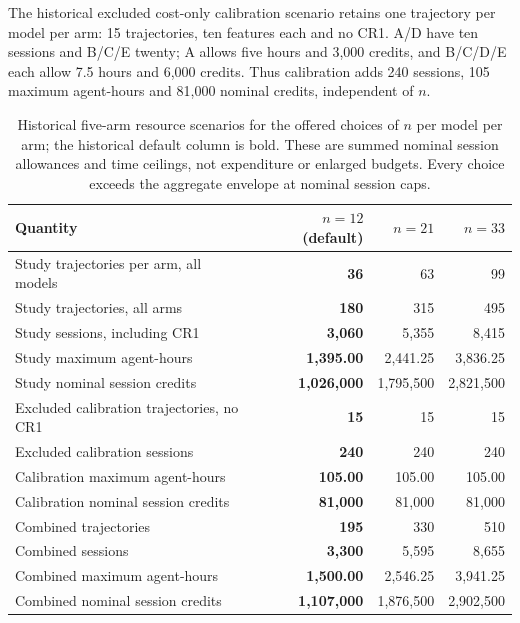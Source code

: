 The historical excluded cost-only calibration scenario retains one trajectory per model per arm:
15 trajectories, ten features each and no CR1. A/D have ten sessions and
B/C/E twenty; A allows five hours and 3,000 credits, and B/C/D/E each
allow 7.5 hours and 6,000 credits. Thus calibration adds 240 sessions,
105 maximum agent-hours and 81,000 nominal credits, independent of $n$.

\begin{table}[!htbp]
\centering\small
\caption{Historical five-arm resource scenarios for the offered choices of $n$ per
model per arm; the historical default column is bold. These are summed nominal
session allowances and time ceilings, not expenditure or enlarged budgets.
Every choice exceeds the aggregate envelope at nominal session caps.}\label{tab:pilotresources}

\begin{tabularx}{\textwidth}{@{}Y>{\bfseries}rrr@{}}
\toprule
Quantity & $n=12$ (default) & $n=21$ & $n=33$ \\
\midrule
Study trajectories per arm, all models & 36 & 63 & 99 \\
Study trajectories, all arms & 180 & 315 & 495 \\
Study sessions, including CR1 & 3,060 & 5,355 & 8,415 \\
Study maximum agent-hours & 1,395.00 & 2,441.25 & 3,836.25 \\
Study nominal session credits & 1,026,000 & 1,795,500 & 2,821,500 \\
Excluded calibration trajectories, no CR1 & 15 & 15 & 15 \\
Excluded calibration sessions & 240 & 240 & 240 \\
Calibration maximum agent-hours & 105.00 & 105.00 & 105.00 \\
Calibration nominal session credits & 81,000 & 81,000 & 81,000 \\
Combined trajectories & 195 & 330 & 510 \\
Combined sessions & 3,300 & 5,595 & 8,655 \\
Combined maximum agent-hours & 1,500.00 & 2,546.25 & 3,941.25 \\
Combined nominal session credits & 1,107,000 & 1,876,500 & 2,902,500 \\
\bottomrule
\end{tabularx}
\end{table}

